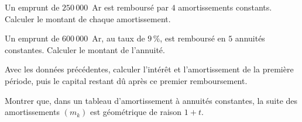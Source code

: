 \begin{entrainement}
\exo[\niveau{1}] Un emprunt de $250\,000$~Ar est remboursé par $4$
amortissements constants. Calculer le montant de chaque amortissement.

\exo[\niveau{2}] Un emprunt de $600\,000$~Ar, au taux de $9\,\%$, est
remboursé en $5$ annuités constantes. Calculer le montant de l'annuité.

\exo[\niveau{2}] Avec les données précédentes, calculer l'intérêt et
l'amortissement de la première période, puis le capital restant dû après ce
premier remboursement.

\exo[\niveau{3}] Montrer que, dans un tableau d'amortissement à annuités
constantes, la suite des amortissements $\left(m_{k}\right)$ est
géométrique de raison $1+t$.
\end{entrainement}

